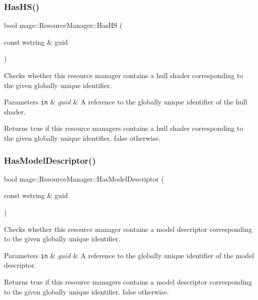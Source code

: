 \subsubsection{\texorpdfstring{Has\+H\+S()}{HasHS()}}
{\footnotesize\ttfamily bool mage\+::\+Resource\+Manager\+::\+Has\+HS (\begin{DoxyParamCaption}\item[{const wstring \&}]{guid }\end{DoxyParamCaption})\hspace{0.3cm}{\ttfamily [noexcept]}}

Checks whether this resource manager contains a hull shader corresponding to the given globally unique identifier.


\begin{DoxyParams}[1]{Parameters}
\mbox{\tt in}  & {\em guid} & A reference to the globally unique identifier of the hull shader. \\
\hline
\end{DoxyParams}
\begin{DoxyReturn}{Returns}
{\ttfamily true} if this resource managers contains a hull shader corresponding to the given globally unique identifier. {\ttfamily false} otherwise. 
\end{DoxyReturn}
\hypertarget{classmage_1_1_resource_manager_a20913b24e2b86b3c59887f6b071bb020}{}\label{classmage_1_1_resource_manager_a20913b24e2b86b3c59887f6b071bb020} 
\subsubsection{\texorpdfstring{Has\+Model\+Descriptor()}{HasModelDescriptor()}}
{\footnotesize\ttfamily bool mage\+::\+Resource\+Manager\+::\+Has\+Model\+Descriptor (\begin{DoxyParamCaption}\item[{const wstring \&}]{guid }\end{DoxyParamCaption})\hspace{0.3cm}{\ttfamily [noexcept]}}

Checks whether this resource manager contains a model descriptor corresponding to the given globally unique identifier.


\begin{DoxyParams}[1]{Parameters}
\mbox{\tt in}  & {\em guid} & A reference to the globally unique identifier of the model descriptor. \\
\hline
\end{DoxyParams}
\begin{DoxyReturn}{Returns}
{\ttfamily true} if this resource managers contains a model descriptor corresponding to the given globally unique identifier. {\ttfamily false} otherwise. 
\end{DoxyReturn}
\hypertarget{classmage_1_1_resource_manager_aa8bb9d0a4217bd02566583402a3241f8}{}\label{classmage_1_1_resource_manager_aa8bb9d0a4217bd02566583402a3241f8} 
